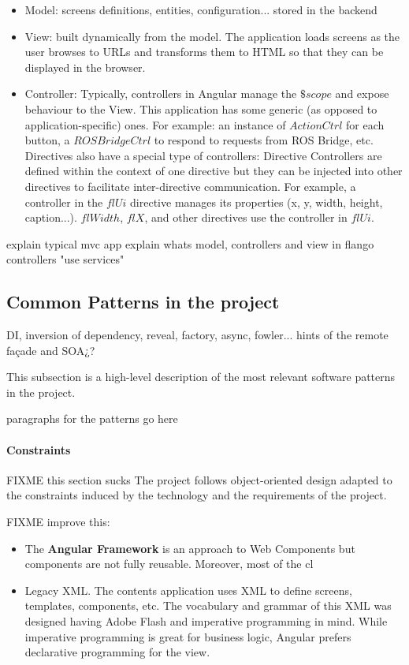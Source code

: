 \begin{itemize}
    \item Model: screens definitions, entities, configuration... stored in the backend
    \item View: built dynamically from the model. The application loads screens as the user browses to \ac{URL}s and transforms them to \ac{HTML} so that they can be displayed in the browser.
    \item Controller: Typically, controllers in Angular manage the $\$scope$ and expose behaviour to the View. This application has some generic (as opposed to application-specific) ones. For example: an instance of $ActionCtrl$ for each button, a $ROSBridgeCtrl$ to respond to requests from ROS Bridge, etc. Directives also have a special type of controllers: Directive Controllers are defined within the context of one directive but they can be injected into other directives to facilitate inter-directive communication. For example, a controller in the $flUi$ directive manages its properties (x, y, width, height, caption...). $flWidth$, $flX$, and other directives use the controller in $flUi$.
\end{itemize}


explain typical mvc app
explain whats model, controllers and view in flango
controllers "use services" 

\subsection{Common Patterns in the project}
DI, inversion of dependency, reveal, factory, async, fowler... hints of the remote façade and SOA¿?

This subsection is a high-level description of the most relevant software patterns in the project.

paragraphs for the patterns go here

\paragraph{Constraints}
FIXME this section sucks
The project follows object-oriented design adapted to the constraints induced by the technology and the requirements of the project.

FIXME improve this:
\begin{itemize}
    \item The \textbf{Angular Framework} is an approach to Web Components but components are not fully reusable. Moreover, most of the cl
    \item  Legacy \ac{XML}. The contents application uses \ac{XML} to define screens, templates, components, etc. The vocabulary and grammar of this \ac{XML} was designed having Adobe Flash and imperative programming in mind. While imperative programming is great for business logic, Angular prefers declarative programming for the view. 
\end{itemize}

